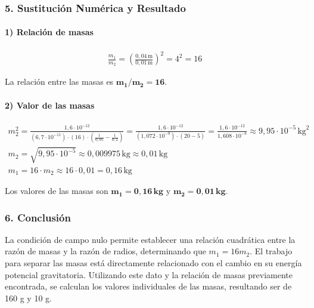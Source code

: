 \subsubsection*{5. Sustitución Numérica y Resultado}
\paragraph{1) Relación de masas}
\begin{gather}
    \frac{m_1}{m_2} = \left(\frac{0,04\,\text{m}}{0,01\,\text{m}}\right)^2 = 4^2 = 16
\end{gather}
\begin{cajaresultado}
La relación entre las masas es $\boldsymbol{m_1/m_2 = 16}$.
\end{cajaresultado}
\paragraph{2) Valor de las masas}
\begin{gather}
    m_2^2 = \frac{1,6\cdot10^{-12}}{ (6,7\cdot10^{-11}) \cdot (16) \cdot \left(\frac{1}{0,05} - \frac{1}{0,2}\right)} = \frac{1,6\cdot10^{-12}}{(1,072\cdot10^{-9}) \cdot (20-5)} = \frac{1,6\cdot10^{-12}}{1,608\cdot10^{-8}} \approx 9,95 \cdot 10^{-5} \, \text{kg}^2 \nonumber \\
    m_2 = \sqrt{9,95 \cdot 10^{-5}} \approx 0,009975 \, \text{kg} \approx 0,01 \, \text{kg} \\
    m_1 = 16 \cdot m_2 \approx 16 \cdot 0,01 = 0,16 \, \text{kg}
\end{gather}
\begin{cajaresultado}
Los valores de las masas son $\boldsymbol{m_1 = 0,16 \, \textbf{kg}}$ y $\boldsymbol{m_2 = 0,01 \, \textbf{kg}}$.
\end{cajaresultado}

\subsubsection*{6. Conclusión}
\begin{cajaconclusion}
La condición de campo nulo permite establecer una relación cuadrática entre la razón de masas y la razón de radios, determinando que $m_1 = 16m_2$. El trabajo para separar las masas está directamente relacionado con el cambio en su energía potencial gravitatoria. Utilizando este dato y la relación de masas previamente encontrada, se calculan los valores individuales de las masas, resultando ser de 160 g y 10 g.
\end{cajaconclusion}

